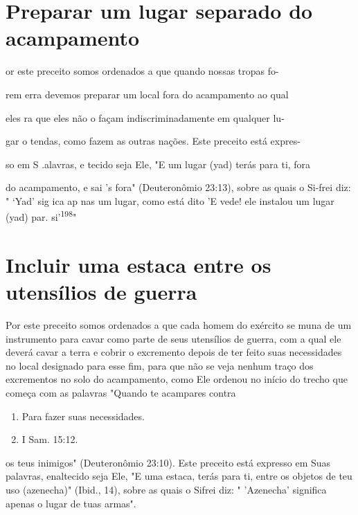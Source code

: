 \section{Preparar um lugar separado do acampamento}


or este preceito somos ordenados a que quando nossas tropas fo-


rem erra devemos preparar um local fora do acampamento ao qual

eles ra que eles não o façam indiscriminadamente em qualquer lu-

gar o tendas, como fazem as outras nações. Este preceito está expres-

so em S .alavras, e tecido seja Ele, "E um lugar (yad) terás para ti,
fora

do acampamento, e sai 's fora" (Deuteronômio 23:13), sobre as quais o
Si-frei diz: " `Yad' sig ica ap nas um lugar, como está dito 'E vede!
ele instalou um lugar (yad) par. si'\textsuperscript{198}"

\section{Incluir uma estaca entre os utensílios de guerra}

Por este preceito somos ordenados a que cada homem do exército se muna
de um instrumento para cavar como parte de seus utensílios de guer­ra,
com a qual ele deverá cavar a terra e cobrir o excremento depois de ter
feito suas necessidades no local designado para esse fim, para que não
se veja ne­nhum traço dos excrementos no solo do acampamento, como Ele
ordenou no início do trecho que começa com as palavras "Quando te
acampares contra


\begin{enumerate}
\def\labelenumi{\arabic{enumi}.}
\setcounter{enumi}{196}
\item
 
 Para fazer suas necessidades.
 
\item
 
 I Sam. 15:12.
 
\end{enumerate}




os teus inimigos" (Deuteronômio 23:10). Este preceito está expresso em
Suas palavras, enaltecido seja Ele, "E uma estaca, terás para ti, entre
os objetos de teu uso (azenecha)" (Ibid., 14), sobre as quais o Sifrei
diz: " 'Azenecha' signifi­ca apenas o lugar de tuas armas".

